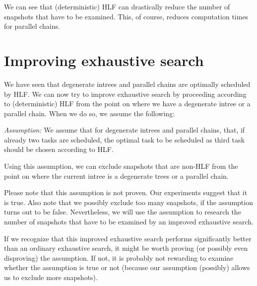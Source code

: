 We can see that (deterministic) HLF can drastically reduce the number of snapshots that have to be examined. This, of course, reduces computation times for parallel chains.

\section{Improving exhaustive search}
\label{sec:improving-exhaustive-search}

We have seen that degenerate intrees and parallel chains are optimally scheduled by HLF. We can now try to improve exhaustive search by proceeding according to (deterministic) HLF from the point on where we have a degenerate intree or a parallel chain. When we do so, we assume the following:

\emph{Assumption:} We assume that for degenerate intrees and parallel chains, that, if already two tasks are scheduled, the optimal task to be scheduled as third task should be chosen according to HLF.

Using this assumption, we can exclude snapshots that are non-HLF from the point on where the current intree is a degenerate trees or a parallel chain.

Please note that this assumption is not proven. Our experiments suggest that it is true. Also note that we possibly exclude too many snapshots, if the assumption turns out to be false. Nevertheless, we will use the assumption to research the number of snapshots that have to be examined by an improved exhaustive search. 

If we recognize that this improved exhaustive search performs significantly better than an ordinary exhaustive search, it might be worth proving (or possibly even disproving) the assumption. If not, it is probably not rewarding to examine whether the assumption is true or not (because our assumption (possibly) allows us to exclude more snapshots).

